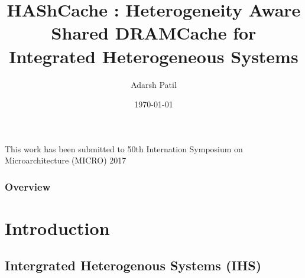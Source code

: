 \documentclass{beamer}
\title[HAShCache]{HAShCache : Heterogeneity Aware Shared DRAMCache
	for Integrated Heterogeneous Systems} %
\author{Adarsh Patil} %
\institute[CSA, IISc] %
{
Department of Computer Science and Automation \\ Indian Institute of Science \\ %
\medskip
\textit{Advisor: Prof. R. Govindarajan} %
}
\date{\today} %
\begin{document}
\begin{frame}
\titlepage %
\centering \tiny{This work has been submitted to 50th Internation Symposium on Microarchitecture (MICRO) 2017}
\end{frame}

\begin{frame}
\frametitle{Overview} %
\tableofcontents %
\end{frame}


\section{Introduction}
\subsection{Intergrated Heterogenous Systems (IHS)} 
\end{document}
